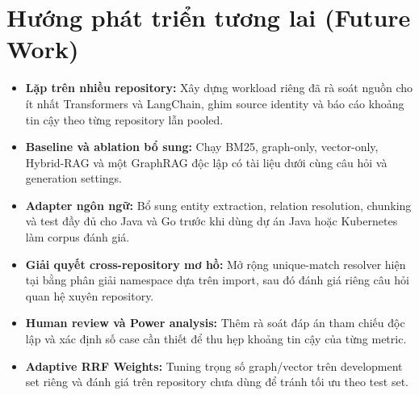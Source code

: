 \documentclass[12pt,a4paper,oneside]{report}
\begin{document}
\section{Hướng phát triển tương lai (Future Work)}
\begin{itemize}
    \item \textbf{Lặp trên nhiều repository:} Xây dựng workload riêng đã rà soát nguồn cho ít nhất Transformers và LangChain, ghim source identity và báo cáo khoảng tin cậy theo từng repository lẫn pooled.
    \item \textbf{Baseline và ablation bổ sung:} Chạy BM25, graph-only, vector-only, Hybrid-RAG và một GraphRAG độc lập có tài liệu dưới cùng câu hỏi và generation settings.
    \item \textbf{Adapter ngôn ngữ:} Bổ sung entity extraction, relation resolution, chunking và test đầy đủ cho Java và Go trước khi dùng dự án Java hoặc Kubernetes làm corpus đánh giá.
    \item \textbf{Giải quyết cross-repository mơ hồ:} Mở rộng unique-match resolver hiện tại bằng phân giải namespace dựa trên import, sau đó đánh giá riêng câu hỏi quan hệ xuyên repository.
    \item \textbf{Human review và Power analysis:} Thêm rà soát đáp án tham chiếu độc lập và xác định số case cần thiết để thu hẹp khoảng tin cậy của từng metric.
    \item \textbf{Adaptive RRF Weights:} Tuning trọng số graph/vector trên development set riêng và đánh giá trên repository chưa dùng để tránh tối ưu theo test set.
\end{itemize}
\end{document}
